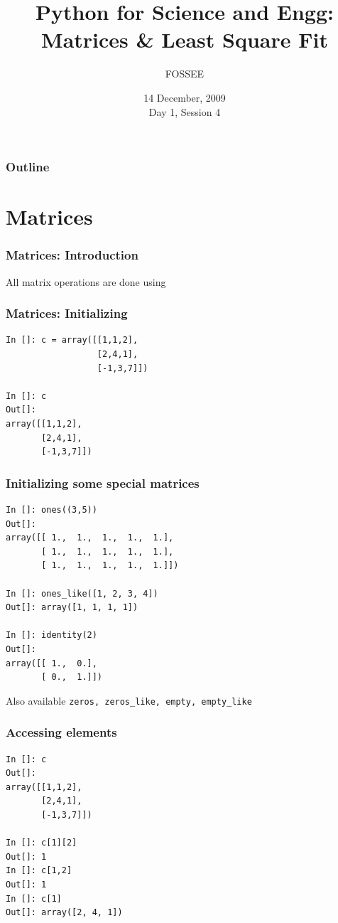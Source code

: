 \documentclass[14pt,compress]{beamer}
\title[Matrices \& Curve Fitting]{Python for Science and Engg: Matrices \& Least Square Fit}
\author[FOSSEE] {FOSSEE}
\institute[IIT Bombay] {Department of Aerospace Engineering\\IIT Bombay}
\date[] {14 December, 2009\\Day 1, Session 4}
\newcommand{\typ}[1]{\lstinline{#1}}
\newcommand{\kwrd}[1]{ \texttt{\textbf{\color{blue}{#1}}}  }
\begin{document}
\begin{frame}
  \titlepage
\end{frame}

\begin{frame}
  \frametitle{Outline}
  \tableofcontents
\end{frame}

\section{Matrices}

\begin{frame}
\frametitle{Matrices: Introduction}
\alert{All matrix operations are done using \kwrd{arrays}}
\end{frame}

\begin{frame}[fragile]
\frametitle{Matrices: Initializing}
\begin{lstlisting}
In []: c = array([[1,1,2],
                  [2,4,1],
                  [-1,3,7]])

In []: c
Out[]: 
array([[1,1,2],
       [2,4,1],
       [-1,3,7]])
\end{lstlisting}
\end{frame}

\begin{frame}[fragile]
\frametitle{Initializing some special matrices}
\begin{small}
  \begin{lstlisting}
In []: ones((3,5))
Out[]: 
array([[ 1.,  1.,  1.,  1.,  1.],
       [ 1.,  1.,  1.,  1.,  1.],
       [ 1.,  1.,  1.,  1.,  1.]])

In []: ones_like([1, 2, 3, 4]) 
Out[]: array([1, 1, 1, 1])   

In []: identity(2)
Out[]: 
array([[ 1.,  0.],
       [ 0.,  1.]])
  \end{lstlisting}
Also available \alert{\typ{zeros, zeros_like, empty, empty_like}}
\end{small}
\end{frame}


\begin{frame}[fragile]
  \frametitle{Accessing elements}
  \begin{lstlisting}
In []: c
Out[]: 
array([[1,1,2],
       [2,4,1],
       [-1,3,7]])

In []: c[1][2]
Out[]: 1
In []: c[1,2]
Out[]: 1
In []: c[1]
Out[]: array([2, 4, 1])
  \end{lstlisting}
\end{frame}
\end{document}
